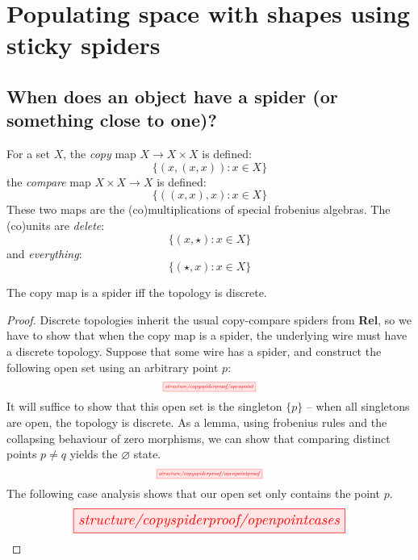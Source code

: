 \section{Populating space with shapes using sticky spiders}\label{sec:stickyspider}


\subsection{When does an object have a spider (or something close to one)?}
\begin{rem}
For a set $X$, the \emph{copy} map $X \rightarrow X \times X$ is defined:
\[\{(x,(x,x)) : x \in X \}\]
the \emph{compare} map $X \times X \rightarrow X$ is defined:
\[\{((x,x),x) : x \in X \}\]
These two maps are the (co)multiplications of special frobenius algebras. The (co)units are \emph{delete}:
\[\{(x,\star) : x \in X\}\]
and \emph{everything}:
\[\{(\star,x) : x \in X\}\]
\end{rem}

\begin{myboxR}
\begin{proposition}\label{prop:copydiscrete}
The copy map is a spider iff the topology is discrete.
\begin{proof}
Discrete topologies inherit the usual copy-compare spiders from \textbf{Rel}, so we have to show that when the copy map is a spider, the underlying wire must have a discrete topology. Suppose that some wire has a spider, and construct the following open set using an arbitrary point $p$:
\[\scalebox{0.5}{\tikzfig{structure/copyspiderproof/openpoint}}\]
It will suffice to show that this open set is the singleton $\{p\}$ -- when all singletons are open, the topology is discrete. As a lemma, using frobenius rules and the collapsing behaviour of zero morphisms, we can show that comparing distinct points $p \neq q$ yields the $\varnothing$ state.
\[\scalebox{0.5}{\tikzfig{structure/copyspiderproof/openpointproof}}\]
The following case analysis shows that our open set only contains the point $p$.
\[\resizebox{0.75\textwidth}{!}{\tikzfig{structure/copyspiderproof/openpointcases}}\]
\end{proof}
\end{proposition}
\end{myboxR}

